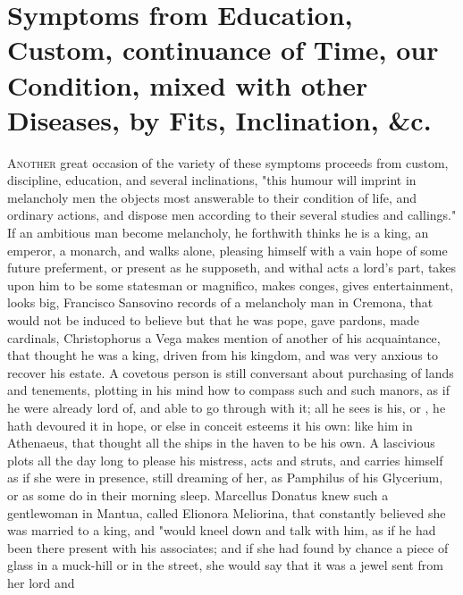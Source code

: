 {%
\section[Symptoms from Education and Custom]{Symptoms from Education, Custom, continuance of Time, our Condition, mixed with other Diseases, by Fits, Inclination, \&c.}

\lettrine{A}{nother} great occasion of the variety of these symptoms proceeds from custom,
discipline, education, and several inclinations, "this
humour will imprint in melancholy men the objects most answerable to their
condition of life, and ordinary actions, and dispose men according to their
several studies and callings." If an ambitious man become melancholy, he
forthwith thinks he is a king, an emperor, a monarch, and walks alone, pleasing
himself with a vain hope of some future preferment, or present as he supposeth,
and withal acts a lord's part, takes upon him to be some statesman or
magnifico, makes conges, gives entertainment, looks big, \etc{} Francisco
Sansovino records of a melancholy man in Cremona, that would not be induced to
believe but that he was pope, gave pardons, made cardinals, \etc{}
Christophorus a Vega makes mention of another of his
acquaintance, that thought he was a king, driven from his kingdom, and was very
anxious to recover his estate. A covetous person is still conversant about
purchasing of lands and tenements, plotting in his mind how to compass such and
such manors, as if he were already lord of, and able to go through with it; all
he sees is his,  or , he hath devoured it in hope, or else in
conceit esteems it his own: like him in Athenaeus, that
thought all the ships in the haven to be his own. A lascivious 
plots all the day long to please his mistress, acts and struts, and carries
himself as if she were in presence, still dreaming of her, as Pamphilus of his
Glycerium, or as some do in their morning sleep. Marcellus
Donatus knew such a gentlewoman in Mantua, called Elionora Meliorina, that
constantly believed she was married to a king, and "would
kneel down and talk with him, as if he had been there present with his
associates; and if she had found by chance a piece of glass in a muck-hill or
in the street, she would say that it was a jewel sent from her lord and
}
